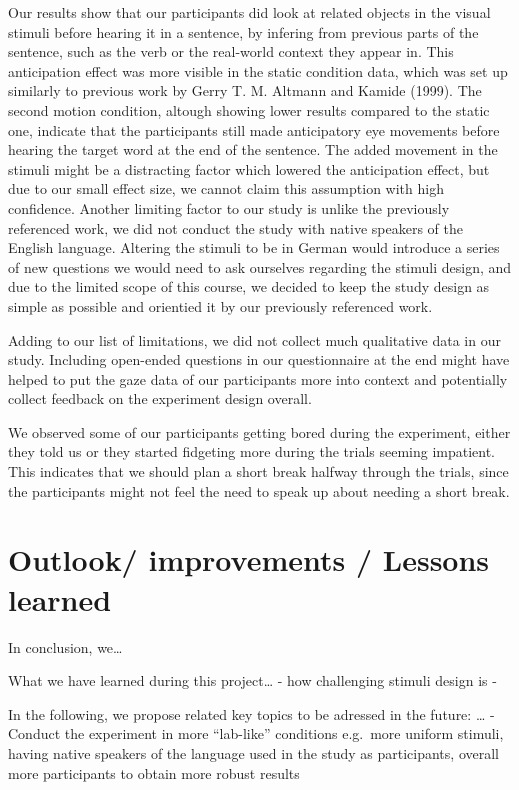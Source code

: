 \documentclass[
  12pt,
  letterpaper,
  DIV=11,
  numbers=noendperiod]{scrreprt}
\begin{document}
Our results show that our participants did look at related objects in
the visual stimuli before hearing it in a sentence, by infering from
previous parts of the sentence, such as the verb or the real-world
context they appear in. This anticipation effect was more visible in the
static condition data, which was set up similarly to previous work by
Gerry T. M. Altmann and Kamide (1999). The second motion condition,
altough showing lower results compared to the static one, indicate that
the participants still made anticipatory eye movements before hearing
the target word at the end of the sentence. The added movement in the
stimuli might be a distracting factor which lowered the anticipation
effect, but due to our small effect size, we cannot claim this
assumption with high confidence. Another limiting factor to our study is
unlike the previously referenced work, we did not conduct the study with
native speakers of the English language. Altering the stimuli to be in
German would introduce a series of new questions we would need to ask
ourselves regarding the stimuli design, and due to the limited scope of
this course, we decided to keep the study design as simple as possible
and orientied it by our previously referenced work.

Adding to our list of limitations, we did not collect much qualitative
data in our study. Including open-ended questions in our questionnaire
at the end might have helped to put the gaze data of our participants
more into context and potentially collect feedback on the experiment
design overall.

We observed some of our participants getting bored during the
experiment, either they told us or they started fidgeting more during
the trials seeming impatient. This indicates that we should plan a short
break halfway through the trials, since the participants might not feel
the need to speak up about needing a short break.

\section{Outlook/ improvements / Lessons
learned}\label{outlook-improvements-lessons-learned}

In conclusion, we\ldots{}

What we have learned during this project\ldots{} - how challenging
stimuli design is -

In the following, we propose related key topics to be adressed in the
future: \ldots{} - Conduct the experiment in more ``lab-like''
conditions e.g.~more uniform stimuli, having native speakers of the
language used in the study as participants, overall more participants to
obtain more robust results
\end{document}
